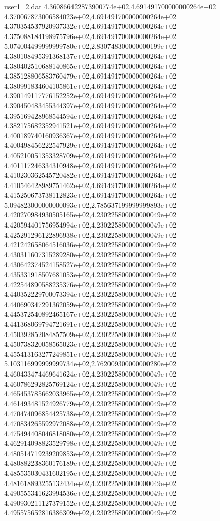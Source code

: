 \begin{filecontents}{user1_2.dat}
4.360866422873900774e+02,4.691491700000000264e+02
4.370067873006584023e+02,4.691491700000000264e+02
4.370354537920937332e+02,4.691491700000000264e+02
4.375088184198975796e+02,4.691491700000000264e+02
5.074004499999999780e+02,2.830748300000000199e+02
4.380108495391368137e+02,4.691491700000000264e+02
4.380402510688140865e+02,4.691491700000000264e+02
4.385128806583760479e+02,4.691491700000000264e+02
4.380991834604105861e+02,4.691491700000000264e+02
4.390149117776152252e+02,4.691491700000000264e+02
4.390450483455344397e+02,4.691491700000000264e+02
4.395169428968544594e+02,4.691491700000000264e+02
4.382175682352941521e+02,4.691491700000000264e+02
4.400189740160936367e+02,4.691491700000000264e+02
4.400498456222547929e+02,4.691491700000000264e+02
4.405210051353328709e+02,4.691491700000000264e+02
4.401117246334310948e+02,4.691491700000000264e+02
4.410230362545720482e+02,4.691491700000000264e+02
4.410546428989751462e+02,4.691491700000000264e+02
4.415250673738112823e+02,4.691491700000000264e+02
5.094823000000000093e+02,2.785637199999999893e+02
4.420270984930505165e+02,4.230225800000000049e+02
4.420594401756954994e+02,4.230225800000000049e+02
4.425291296122896938e+02,4.230225800000000049e+02
4.421242658064516036e+02,4.230225800000000049e+02
4.430311607315289280e+02,4.230225800000000049e+02
4.430642374524158527e+02,4.230225800000000049e+02
4.435331918507681053e+02,4.230225800000000049e+02
4.422544890588235376e+02,4.230225800000000049e+02
4.440352229700073394e+02,4.230225800000000049e+02
4.440690347291362059e+02,4.230225800000000049e+02
4.445372540892465167e+02,4.230225800000000049e+02
4.441368069794721691e+02,4.230225800000000049e+02
4.450392852084857509e+02,4.230225800000000049e+02
4.450738320058565023e+02,4.230225800000000049e+02
4.455413163277249851e+02,4.230225800000000049e+02
5.103116999999999734e+02,2.762009300000000280e+02
4.460433474469641624e+02,4.230225800000000049e+02
4.460786292825769124e+02,4.230225800000000049e+02
4.465453785662033965e+02,4.230225800000000049e+02
4.461493481524926779e+02,4.230225800000000049e+02
4.470474096854425738e+02,4.230225800000000049e+02
4.470834265592972088e+02,4.230225800000000049e+02
4.475494408046818080e+02,4.230225800000000049e+02
4.462914098823529798e+02,4.230225800000000049e+02
4.480514719239209853e+02,4.230225800000000049e+02
4.480882238360176189e+02,4.230225800000000049e+02
4.485535030431602195e+02,4.230225800000000049e+02
4.481618893255132434e+02,4.230225800000000049e+02
4.490555341623994536e+02,4.230225800000000049e+02
4.490930211127379152e+02,4.230225800000000049e+02
4.495575652816386309e+02,4.230225800000000049e+02

\end{filecontents}
